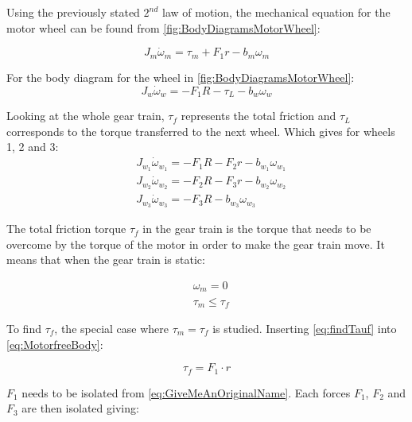Using the previously stated $2^{nd}$ law of motion, the mechanical equation for the motor wheel can be found from \autoref{fig:BodyDiagramsMotorWheel}:

\begin{equation}
    J_m \dot{\omega}_m = \tau_m + F_1r - b_m\omega_m
    \label{eq:MotorfreeBody}
\end{equation}

For the body diagram for the wheel in \autoref{fig:BodyDiagramsMotorWheel}:
\begin{equation}
	J_w\dot{\omega}_w = -F_1R -\tau_L -b_w\omega_w
\end{equation}

Looking at the whole gear train, $\tau_f$ represents the total friction and $\tau_L$ corresponds to the torque transferred to the next wheel. Which gives for wheels 1, 2 and 3:
\begin{subequations} 
	\begin{flalign}
		&J_{w_1}\dot{\omega}_{w_1} = -F_1R -F_2r -b_{w_1}\omega_{w_1} \\ \label{eq:GiveMeAnOriginalName}
		&J_{w_2}\dot{\omega}_{w_2} = -F_2R -F_3r -b_{w_2}\omega_{w_2} \\
		&J_{w_3}\dot{\omega}_{w_3}= -F_3R -b_{w_3}\omega_{w_3}
	\end{flalign}
\end{subequations}

The total friction torque $\tau_f$ in the gear train is the torque that needs to be overcome by the torque of the motor in order to make the gear train move. It means that when the gear train is static:

\begin{subequations} \label{eq:findTauf}
	\begin{flalign}
		&\omega_m = 0\\
		&\tau_m \leqslant \tau_f
	\end{flalign}
\end{subequations}

To find $\tau_f$, the special case where $\tau_m = \tau_f$ is studied. Inserting \autoref{eq:findTauf} into \autoref{eq:MotorfreeBody}:

\begin{equation} 
		\tau_f = F_1 \cdot r
		\label{eq:TaufF1r}
\end{equation}

$F_1$ needs to be isolated from \autoref{eq:GiveMeAnOriginalName}. Each forces $F_1$, $F_2$ and $F_3$ are then isolated giving: 


